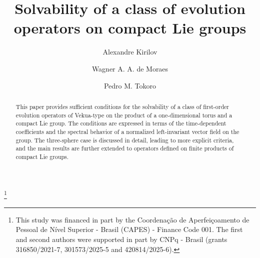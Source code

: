 \documentclass[11pt,reqno]{amsart}
\numberwithin{equation}{section}
\begin{document}
	
	\title[Solvability of a class of evolution operators]{Solvability of a class of evolution operators on compact Lie groups}
	
	\author[Kirilov]{Alexandre Kirilov}
	\address{
		Departamento de Matem\'atica 
		Universidade Federal do Paran\'a  
		CP 19096, CEP 81530-090, Curitiba 
		Brasil}
	
	\thanks{This study was financed in part by the Coordena\c c\~ao de Aperfei\c coamento de Pessoal de N\'ivel Superior - Brasil (CAPES) - Finance Code 001. The first and second authors were supported in part by CNPq - Brasil (grants 316850/2021-7, 301573/2025-5 and 420814/2025-6).}
	
	\author[de Moraes]{Wagner A. A. de Moraes}
	\address{
		Departamento de Matem\'atica  
		Universidade Federal do Paran\'a  
		Caixa Postal 19096\\  CEP 81530-090, Curitiba, Paran\'a 
		Brasil}
	
	\author[Tokoro]{Pedro M. Tokoro}
	\address{
		Programa de P\'os-Gradua\c c\~ao em Matem\'atica  
		Universidade Federal do Paran\'a  
		Caixa Postal 19096\\  CEP 81530-090, Curitiba, Paran\'a  
		Brasil}
	
	

	
	
	
\begin{abstract}
	This paper provides sufficient conditions for the solvability of a class of first-order evolution operators of Vekua-type on the product of a one-dimensional torus and a compact Lie group. The conditions are expressed in terms of the time-dependent coefficients and the spectral behavior of a normalized left-invariant vector field on the group. The three-sphere case is discussed in detail, leading to more explicit criteria, and the main results are further extended to operators defined on finite products of compact Lie groups.
\end{abstract}
	
	\maketitle
	
\end{document}
